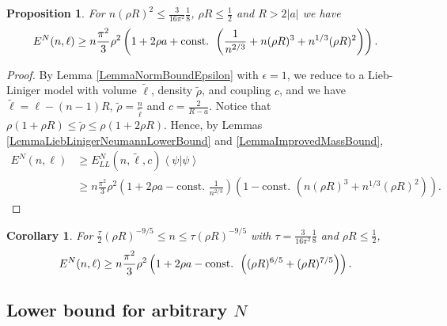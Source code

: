 \documentclass[a4paper,11pt]{article}
\newcommand{\abs}[1]{\left\lvert #1 \right\rvert}
\renewcommand{\braket}[1]{\left\langle#1\right\rangle}
\newtheorem{proposition}[theorem]{Proposition}
\newtheorem{corollary}[theorem]{Corollary}
\numberwithin{equation}{section}
\begin{document}
	\begin{proposition}
		\label{PropositionLowerBoundSpecN}
		For $ n(\rho R)^2\leq  \frac{3}{16\pi^2}\frac{1}{8} $, $ \rho R\leq \frac{1}{2} $ and $ R>2\abs{a} $ we have \begin{equation}
			E^N(n,\ell)\geq n\frac{\pi^2}{3}\rho^2\left(1+2\rho a+\textnormal{const. }\left(\frac{1}{n^{2/3}}+n(\rho R)^3+n^{1/3}(\rho R)^2\right)\right).
		\end{equation}
	\end{proposition}
	\begin{proof}
		By Lemma \ref{LemmaNormBoundEpsilon} with $ \epsilon=1 $, we reduce to a Lieb-Liniger model with volume $ \tilde{\ell} $, density $ \tilde{\rho} $, and coupling $ c $, and we have $ \tilde{\ell}=\ell-(n-1)R $, $ \tilde{\rho}=\frac{n}{\tilde{\ell}} $ and $ c=\frac{2}{R-a} $. Notice that $\rho(1+\rho R)\leq \tilde{\rho}\leq \rho(1+2\rho R)$. Hence, by Lemmas \ref{LemmaLiebLinigerNeumannLowerBound} and \ref{LemmaImprovedMassBound}, \begin{equation}
			\begin{aligned}
				E^N(n,\ell)&\geq E_{LL}^N(n,\tilde{\ell},c)\braket{\psi|\psi}\\&\geq
				n\frac{\pi^2}{3}\rho^2\left(1+2\rho a-\text{const. }\frac{1}{n^{2/3}}\right)\left(1-\text{const. }\left(n(\rho R)^3+n^{1/3}(\rho R)^2\right)\right).
			\end{aligned}
		\end{equation}
	\end{proof}
	\begin{corollary} \label{CorollaryLowerBoundSpecN}
		For $ \frac{\tau}{2} (\rho R)^{-9/5}\leq n\leq \tau (\rho R)^{-9/5} $ with $ \tau=\frac{3}{16\pi^2}\frac{1}{8} $ and $ \rho R\leq \frac{1}{2} $, 
		\begin{equation}
			E^N(n,\ell)\geq n\frac{\pi^2}{3}\rho^2\left(1+2\rho a-\textnormal{const. }\left((\rho R)^{6/5}+(\rho R)^{7/5}\right)\right).
		\end{equation}
	\end{corollary}
	\subsection{Lower bound for arbitrary $N$}
	\label{seclowboundarbn}
	
	
\end{document}
